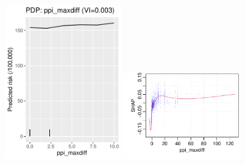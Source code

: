 \documentclass[12pt]{article}
\begin{document}
\begin{figure}[h]
\centering
\includegraphics[width=0.45\textwidth]{figures/pdp/ppi_maxdiff.pdf}
\includegraphics[width=0.45\textwidth]{figures/shap/ppi_maxdiff.pdf}
\end{figure}
\end{document}
